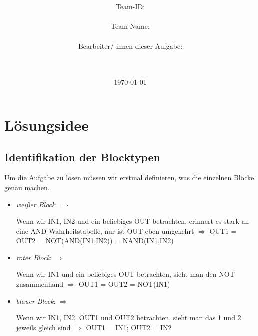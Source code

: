 \documentclass[a4paper,10pt,ngerman]{scrartcl}
\title{\textbf{\Huge\Aufgabe}}
\author{\LARGE Team-ID: \LARGE \TeamId \\\\
	    \LARGE Team-Name: \LARGE \TeamName \\\\
	    \LARGE Bearbeiter/-innen dieser Aufgabe: \\ 
	    \LARGE \Namen\\\\}
\date{\LARGE\today}
\begin{document}
\maketitle
\tableofcontents

\vspace{0.5cm}


\section{Lösungsidee}
\label{Lösungsidee}\label{sec:loesungsidee}
\subsection{Identifikation der Blocktypen}
Um die Aufgabe zu lösen müssen wir erstmal definieren, was die einzelnen Blöcke genau machen.
\begin{itemize}
  \setlength\itemsep{0.5cm}
  \item \emph{weißer Block}:  $\Rightarrow$ \begin{minipage}{0.4\textwidth}Wenn wir IN1, IN2 und ein beliebiges OUT betrachten, erinnert es stark an eine AND Wahrheitstabelle, nur ist OUT eben umgekehrt $\Rightarrow$ OUT1 = OUT2 = NOT(AND(IN1,IN2)) = NAND(IN1,IN2) \end{minipage}
  \item \emph{roter Block}: \hspace{1.375cm}  $\Rightarrow$ \begin{minipage}{0.4\textwidth}Wenn wir IN1 und ein beliebiges OUT betrachten, sieht man den NOT zusammenhand $\Rightarrow$ OUT1 = OUT2 = NOT(IN1)\end{minipage}
  \item \emph{blauer Block}:  $\Rightarrow$ \begin{minipage}{0.4\textwidth}Wenn wir IN1, IN2, OUT1 und OUT2 betrachten, sieht man das 1 und 2 jeweils gleich sind $\Rightarrow$ OUT1 = IN1; OUT2 = IN2 \end{minipage}
\end{itemize}
\end{document}
